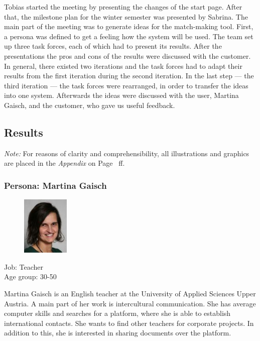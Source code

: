 \documentclass[a4paper,oneside,titlepage]{article}
\begin{document}
Tobias started the meeting by presenting the changes of the start page. After that, the milestone plan for the winter semester was presented by Sabrina.
The main part of the meeting was to generate ideas for the match-making tool.
First, a persona was defined to get a feeling how the system will be used.
The team set up three task forces, each of which had to present its results. After the presentations the pros and cons of the results were discussed with the customer. In general, there existed two iterations and the task forces had to adapt their results from the first iteration during the second iteration. In the last step --- the third iteration --- the task forces were rearranged, in order to transfer the ideas into one system. Afterwards the ideas were discussed with the user, Martina Gaisch, and the customer, who gave us useful feedback. 

\subsection{Results}

\emph{Note:} For reasons of clarity and comprehensibility, all illustrations and graphics are placed in the \emph{Appendix} on Page~\pageref{sec:appendix} ff.

\subsubsection[Personas]{Persona: Martina Gaisch}

\begin{figure}
	\vspace{-20pt}
  	\begin{center}
    \includegraphics[width=0.2\textwidth]{gaisch}
  \end{center}
\end{figure}

Job: Teacher\\
Age group: 30-50

Martina Gaisch is an English teacher at the University of Applied Sciences Upper Austria. A main part of her work is intercultural communication. She has average computer skills and searches for a platform, where she is able to establish international contacts. She wants to find other teachers for corporate projects. In addition to this, she is interested in sharing documents over the platform.
\end{document}
